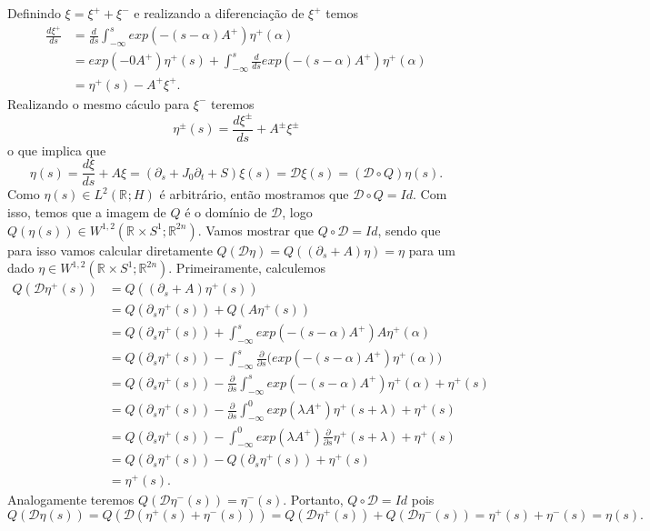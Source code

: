 \documentclass[12pt]{book}
\newcommand{\circulo}{S^{1}}
\newcommand{\diferebcialmapafloerabrev}{\mathcal{D}}
\newcommand{\derivada}[2]{\frac{d #1}{d #2}}
\newcommand{\derivadaparcial}[2]{\frac{\partial #1}{\partial #2}}
\newcommand{\derivadaparcialabrev}[1]{\partial_{#1}}
\newcommand{\espacoLdois}[1]{L^{2}(#1)}
\newcommand{\espacosobolevgeral}[2]{W^{1,#1}(#2)}
\newcommand{\estruturacomplexa}{J_{0}}
\newcommand{\retacartesianocirculo}{\real{} \times \circulo}
\newcommand{\real}[1]{\mathbb{R}^{#1}}
\newcommand{\reta}{\real{}}
\begin{document}
	Definindo $\xi = \xi^{+} + \xi^{-}$ e realizando a diferenciação de $\xi^{+}$ temos
	$$
	\begin{aligned}
		\derivada{\xi^{+}}{s} 
		&= \derivada{}{s}\int_{-\infty}^{s}exp(-(s-\alpha)A^{+})\eta^{+}(\alpha)
		\\
		&= exp(-0A^{+})\eta^{+}(s)+\int_{-\infty}^{s} \derivada{}{s} exp(-(s-\alpha)A^{+})\eta^{+}(\alpha) 
		\\
		&= \eta^{+}(s)-A^{+}\xi^{+}.
	\end{aligned}
	$$
	Realizando o mesmo cáculo para $\xi^{-}$ teremos 
	$$
	 \eta^{\pm}(s) =\derivada{\xi^{\pm}}{s}+A^{\pm}\xi^{\pm}
	$$
	o que implica que
	$$
	\eta(s) =\derivada{\xi}{s}+A\xi = (\derivadaparcialabrev{s}+\estruturacomplexa \derivadaparcialabrev{t} + S)\xi(s) = \diferebcialmapafloerabrev \xi(s) = (\diferebcialmapafloerabrev \circ Q)\eta(s).
	$$
	Como $\eta(s) \in \espacoLdois{\reta; H}$ é arbitrário, então mostramos que $\diferebcialmapafloerabrev \circ Q = Id$. Com isso, temos que a imagem de $Q$ é o domínio de $\diferebcialmapafloerabrev$, logo $Q(\eta(s)) \in \espacosobolevgeral{2}{\retacartesianocirculo;\real{2n}}$. Vamos mostrar que $Q\circ \diferebcialmapafloerabrev = Id$, sendo que para isso vamos calcular diretamente $Q(\diferebcialmapafloerabrev\eta)=Q((\derivadaparcialabrev{s}+A)\eta) = \eta$ para um dado $\eta \in \espacosobolevgeral{2}{\retacartesianocirculo;\real{2n}}$. Primeiramente, calculemos 
	$$
	\begin{aligned}
		Q(\diferebcialmapafloerabrev \eta^{+}(s))
		&=Q((\derivadaparcialabrev{s}+A)\eta^{+}(s))
		\\
		&=Q(\derivadaparcialabrev{s}\eta^{+}(s)) +Q(A\eta^{+}(s))
		\\
		&=Q(\derivadaparcialabrev{s}\eta^{+}(s))  + \int_{-\infty}^{s}exp(-(s-\alpha)A^{+})A\eta^{+}(\alpha)
		\\
		&=Q(\derivadaparcialabrev{s}\eta^{+}(s))  - \int_{-\infty}^{s}\derivadaparcial{}{s}\Big(exp(-(s-\alpha)A^{+})\eta^{+}(\alpha)\Big)
		\\
		&=Q(\derivadaparcialabrev{s}\eta^{+}(s)) - \derivadaparcial{}{s}\int_{-\infty}^{s} exp(-(s-\alpha)A^{+})\eta^{+}(\alpha) + \eta^{+}(s)
		\\
		&=Q(\derivadaparcialabrev{s}\eta^{+}(s)) - \derivadaparcial{}{s}\int_{-\infty}^{0} exp(\lambda A^{+})\eta^{+}(s+\lambda) + \eta^{+}(s)
		\\
		&=Q(\derivadaparcialabrev{s}\eta^{+}(s)) - \int_{-\infty}^{0} exp(\lambda A^{+})\derivadaparcial{}{s}\eta^{+}(s+\lambda) + \eta^{+}(s)
		\\
		&=Q(\derivadaparcialabrev{s}\eta^{+}(s)) - Q(\derivadaparcialabrev{s}\eta^{+}(s)) + \eta^{+}(s)
		\\
		&=\eta^{+}(s).
	\end{aligned}
	$$
	Analogamente teremos $Q(\diferebcialmapafloerabrev \eta^{-}(s)) =\eta^{-}(s)$. Portanto, $Q\circ \diferebcialmapafloerabrev = Id$ pois
	$$
	Q(\diferebcialmapafloerabrev \eta(s)) = Q(\diferebcialmapafloerabrev (\eta^{+}(s)+\eta^{-}(s)))=Q(\diferebcialmapafloerabrev \eta^{+}(s))+Q(\diferebcialmapafloerabrev \eta^{-}(s)) = \eta^{+}(s)+\eta^{-}(s) = \eta(s).
	$$
	
\end{document}
